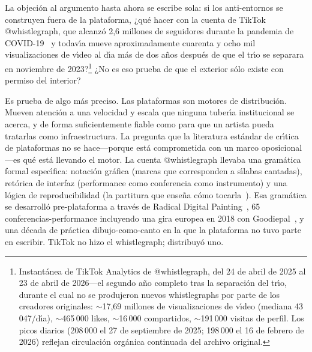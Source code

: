 \documentclass[10pt,letterpaper,twocolumn]{article}
\begin{document}
La objeci\'{o}n al argumento hasta ahora se escribe sola: si los anti-entornos se construyen fuera de la plataforma, ¿qu\'{e} hacer con la cuenta de TikTok @whistlegraph, que alcanz\'{o} 2,6 millones de seguidores durante la pandemia de COVID-19~\citep{scudder2026whistlegraph} y todav\'{\i}a mueve aproximadamente cuarenta y ocho mil visualizaciones de v\'{\i}deo al d\'{\i}a m\'{a}s de dos a\~{n}os despu\'{e}s de que el tr\'{\i}o se separara en noviembre de 2023?\footnote{Instant\'{a}nea de TikTok Analytics de @whistlegraph, del 24 de abril de 2025 al 23 de abril de 2026---el segundo a\~{n}o completo tras la separaci\'{o}n del tr\'{\i}o, durante el cual no se produjeron nuevos whistlegraphs por parte de los creadores originales: $\sim$17,69 millones de visualizaciones de v\'{\i}deo (mediana 43\,047/d\'{\i}a), $\sim$465\,000 likes, $\sim$16\,000 compartidos, $\sim$191\,000 visitas de perfil. Los picos diarios (208\,000 el 27 de septiembre de 2025; 198\,000 el 16 de febrero de 2026) reflejan circulaci\'{o}n org\'{a}nica continuada del archivo original.} ¿No es eso prueba de que el exterior s\'{o}lo existe con permiso del interior?

Es prueba de algo m\'{a}s preciso. Las plataformas son motores de distribuci\'{o}n. Mueven atenci\'{o}n a una velocidad y escala que ninguna tuber\'{\i}a institucional se acerca, y de forma suficientemente fiable como para que un artista pueda tratarlas como infraestructura. La pregunta que la literatura est\'{a}ndar de cr\'{\i}tica de plataformas no se hace---porque est\'{a} comprometida con un marco oposicional---es qu\'{e} est\'{a} llevando el motor. La cuenta @whistlegraph llevaba una gram\'{a}tica formal espec\'{\i}fica: notaci\'{o}n gr\'{a}fica (marcas que corresponden a s\'{\i}labas cantadas), ret\'{o}rica de interfaz (performance como conferencia como instrumento) y una l\'{o}gica de reproducibilidad (la partitura que ense\~{n}a c\'{o}mo tocarla~\citep{scudder2026whistlegraph}). Esa gram\'{a}tica se desarroll\'{o} pre-plataforma a trav\'{e}s de Radical Digital Painting~\citep{scudder2017manifesto, scudder2018rdp35c3}, 65 conferencias-performance incluyendo una gira europea en 2018 con Goodiepal~\citep{scudder2026goodiepal}, y una d\'{e}cada de pr\'{a}ctica dibujo-como-canto en la que la plataforma no tuvo parte en escribir. TikTok no hizo el whistlegraph; distribuy\'{o} uno.
\end{document}
